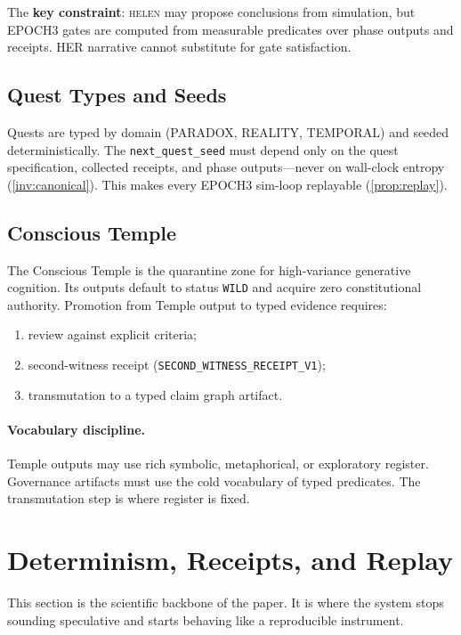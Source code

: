 \documentclass[11pt,a4paper]{article}
\theoremstyle{plain}
\theoremstyle{definition}
\theoremstyle{remark}
\begin{document}
The \textbf{key constraint}: \textsc{helen} may propose conclusions from simulation,
but EPOCH3 gates are computed from measurable predicates over phase outputs and receipts.
HER narrative cannot substitute for gate satisfaction.

\subsection{Quest Types and Seeds}

Quests are typed by domain (PARADOX, REALITY, TEMPORAL) and seeded deterministically.
The \texttt{next\_quest\_seed} must depend only on the quest specification,
collected receipts, and phase outputs---never on wall-clock entropy
(\cref{inv:canonical}).
This makes every EPOCH3 sim-loop replayable (\cref{prop:replay}).

\subsection{Conscious Temple}

The Conscious Temple is the quarantine zone for high-variance generative cognition.
Its outputs default to status \texttt{WILD} and acquire zero constitutional authority.
Promotion from Temple output to typed evidence requires:
\begin{enumerate}[nosep]
  \item review against explicit criteria;
  \item second-witness receipt (\texttt{SECOND\_WITNESS\_RECEIPT\_V1});
  \item transmutation to a typed claim graph artifact.
\end{enumerate}

\paragraph{Vocabulary discipline.}
Temple outputs may use rich symbolic, metaphorical, or exploratory register.
Governance artifacts must use the cold vocabulary of typed predicates.
The transmutation step is where register is fixed.

\section{Determinism, Receipts, and Replay}
\label{sec:determinism}

This section is the scientific backbone of the paper.
It is where the system stops sounding speculative and starts behaving
like a reproducible instrument.
\end{document}
